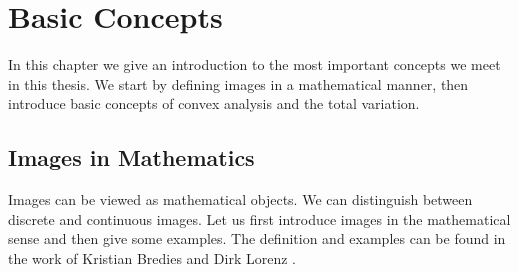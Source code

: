 \documentclass[abstracton]{scrreprt}
\begin{document}
\chapter{Basic Concepts} %
\label{cha:basic_concepts}

    In this chapter we give an introduction to the most important concepts we meet in this thesis. We start by defining images in a mathematical manner, then introduce basic concepts of convex analysis and the total variation.
    \section{Images in Mathematics} %
    \label{sec:images_in_mathematics}

        Images can be viewed as mathematical objects. We can distinguish between discrete and continuous images. Let us first introduce images in the mathematical sense and then give some examples. The definition and examples can be found in the work of Kristian Bredies and Dirk Lorenz \cite{Bredies}.
\end{document}
